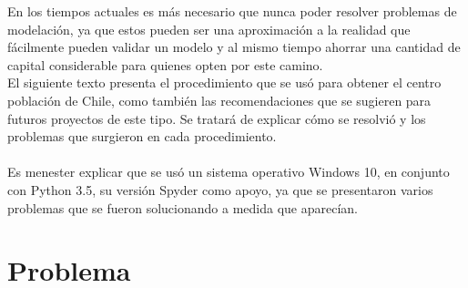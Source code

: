 \documentclass[20pt]{report}
\begin{document}
En los tiempos actuales es m\'as  necesario  que nunca poder resolver problemas de modelaci\'on, ya que estos pueden  ser una aproximaci\'on a la realidad que f\'acilmente pueden validar un modelo y al mismo tiempo ahorrar una cantidad de capital considerable para quienes opten por este camino. 
\\
El siguiente texto presenta  el procedimiento que se us\'o para obtener el centro poblaci\'on de Chile, como tambi\'en las recomendaciones que se sugieren para futuros proyectos de este tipo. Se tratar\'a de explicar c\'omo se resolvi\'o y los problemas que surgieron en cada procedimiento.\\
\\
Es menester explicar que se us\'o un sistema operativo Windows 10, en conjunto con Python 3.5, su versi\'on Spyder como apoyo, ya que se presentaron varios problemas que se fueron solucionando a medida que aparec\'ian.

\pagebreak



\chapter{Problema }\label{cap.introduccion}
\end{document}
